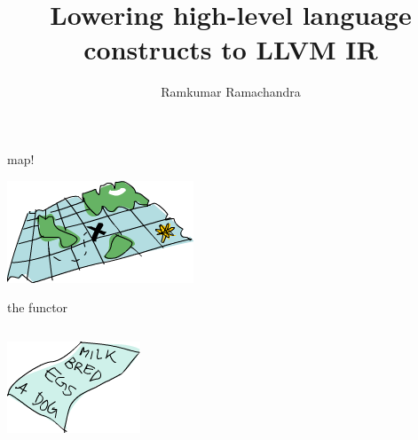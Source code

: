 \documentclass{beamer}
\title{Lowering high-level language constructs to LLVM IR}
\author{Ramkumar Ramachandra}
\begin{document}
\begin{frame}
  \titlepage
\end{frame}

\begin{frame}
  
  
\end{frame}

\begin{frame}
  
  
\end{frame}

\begin{frame}
  
  
\end{frame}

\begin{frame}{map!}
  \begin{center}\includegraphics[scale=0.6]{map}\end{center}
  \vfill
  
\end{frame}

\begin{frame}{the functor}
  \begin{columns}
    \begin{column}[b]{5.5cm}
      \includegraphics[scale=0.6]{list}
    \end{column}
    \begin{column}[b]{4.5cm}
      
    \end{column}
  \end{columns}
\end{frame}
\end{document}
